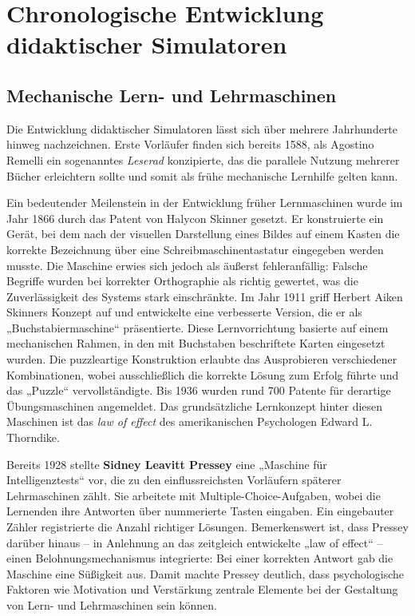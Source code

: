 \section{Chronologische Entwicklung didaktischer Simulatoren}


\subsection{Mechanische Lern- und Lehrmaschinen}

Die Entwicklung didaktischer Simulatoren lässt sich über mehrere Jahrhunderte hinweg nachzeichnen. Erste Vorläufer finden sich bereits 1588, als Agostino Remelli ein sogenanntes \textit{Leserad} konzipierte, das die parallele Nutzung mehrerer Bücher erleichtern sollte und somit als frühe mechanische Lernhilfe gelten kann.\parencite{cayetano_geschichte_2022}

Ein bedeutender Meilenstein in der Entwicklung früher Lernmaschinen wurde im Jahr 1866 durch das Patent von Halycon Skinner gesetzt. Er konstruierte ein Gerät, bei dem nach der visuellen Darstellung eines Bildes auf einem Kasten die korrekte Bezeichnung über eine Schreibmaschinentastatur eingegeben werden musste. Die Maschine erwies sich jedoch als äußerst fehleranfällig: Falsche Begriffe wurden bei korrekter Orthographie als richtig gewertet, was die Zuverlässigkeit des Systems stark einschränkte. Im Jahr 1911 griff Herbert Aiken Skinners Konzept auf und entwickelte eine verbesserte Version, die er als „Buchstabiermaschine“ präsentierte. Diese Lernvorrichtung basierte auf einem mechanischen Rahmen, in den mit Buchstaben beschriftete Karten eingesetzt wurden. Die puzzleartige Konstruktion erlaubte das Ausprobieren verschiedener Kombinationen, wobei ausschließlich die korrekte Lösung zum Erfolg führte und das „Puzzle“ vervollständigte. Bis 1936 wurden rund 700 Patente für derartige Übungsmaschinen angemeldet. Das grundsätzliche Lernkonzept hinter diesen Maschinen ist das \textit{law of effect} des amerikanischen Psychologen Edward L. Thorndike.\parencite[S.~3]{niegemann_kompendium_2008}

Bereits 1928 stellte \textbf{Sidney Leavitt Pressey} eine „Maschine für Intelligenztests“ vor, die zu den einflussreichsten Vorläufern späterer Lehrmaschinen zählt. Sie arbeitete mit Multiple-Choice-Aufgaben, wobei die Lernenden ihre Antworten über nummerierte Tasten eingaben. Ein eingebauter Zähler registrierte die Anzahl richtiger Lösungen. Bemerkenswert ist, dass Pressey darüber hinaus -- in Anlehnung an das zeitgleich entwickelte „law of effect“ -- einen Belohnungsmechanismus integrierte: Bei einer korrekten Antwort gab die Maschine eine Süßigkeit aus. Damit machte Pressey deutlich, dass psychologische Faktoren wie Motivation und Verstärkung zentrale Elemente bei der Gestaltung von Lern- und Lehrmaschinen sein können.\parencite[S.~705]{benjamin_history_1988}\parencite[S.~969f]{skinner_teaching_1958}


